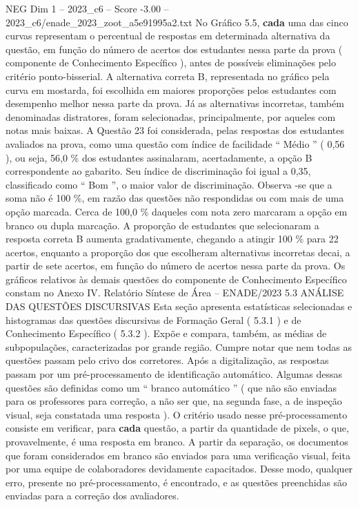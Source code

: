 \begin{textsample}{NEG Dim 1 – 2023\_c6 – Score -3.00 – 2023\_c6/enade\_2023\_zoot\_a5e91995a2.txt}
No Gráfico 5.5, \textbf{cada} uma das cinco curvas representam o percentual de respostas em determinada alternativa da questão, em função do número de acertos dos estudantes nessa parte da prova ( componente de Conhecimento Específico ), antes de possíveis eliminações pelo critério ponto-bisserial.
A alternativa correta B, representada no gráfico pela curva em mostarda, foi escolhida em maiores proporções pelos estudantes com desempenho melhor nessa parte da prova.
Já as alternativas incorretas, também denominadas distratores, foram selecionadas, principalmente, por aqueles com notas mais baixas.
A Questão 23 foi considerada, pelas respostas dos estudantes avaliados na prova, como uma questão com índice de facilidade “ Médio ” ( 0,56 ), ou seja, 56,0 \% dos estudantes assinalaram, acertadamente, a opção B correspondente ao gabarito.
Seu índice de discriminação foi igual a 0,35, classificado como “ Bom ”, o maior valor de discriminação.
Observa -se que a soma não é 100 \%, em razão das questões não respondidas ou com mais de uma opção marcada.
Cerca de 100,0 \% daqueles com nota zero marcaram a opção em branco ou dupla marcação.
A proporção de estudantes que selecionaram a resposta correta B aumenta gradativamente, chegando a atingir 100 \% para 22 acertos, enquanto a proporção dos que escolheram alternativas incorretas decai, a partir de sete acertos, em função do número de acertos nessa parte da prova.
Os gráficos relativos às demais questões do componente de Conhecimento Específico constam no Anexo IV.
Relatório Síntese de Área – ENADE/2023 5.3 ANÁLISE DAS QUESTÕES DISCURSIVAS Esta seção apresenta estatísticas selecionadas e histogramas das questões discursivas de Formação Geral ( 5.3.1 ) e de Conhecimento Específico ( 5.3.2 ).
Expõe e compara, também, as médias de subpopulações, caracterizadas por grande região.
Cumpre notar que nem todas as questões passam pelo crivo dos corretores.
Após a digitalização, as respostas passam por um pré-processamento de identificação automático.
Algumas dessas questões são definidas como um “ branco automático ” ( que não são enviadas para os professores para correção, a não ser que, na segunda fase, a de inspeção visual, seja constatada uma resposta ).
O critério usado nesse pré-processamento consiste em verificar, para \textbf{cada} questão, a partir da quantidade de pixels, o que, provavelmente, é uma resposta em branco.
A partir da separação, os documentos que foram considerados em branco são enviados para uma verificação visual, feita por uma equipe de colaboradores devidamente capacitados.
Desse modo, qualquer erro, presente no pré-processamento, é encontrado, e as questões preenchidas são enviadas para a correção dos avaliadores.

\end{textsample}
